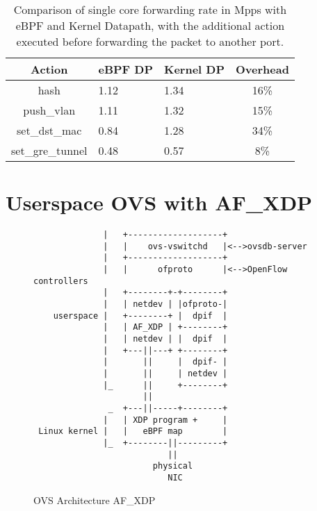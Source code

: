 \documentclass[10pt]{sigplanconf}
\begin{document}
\begin{table}
\centering
\small
\begin{tabular}{|c | p{1.4cm} | p{1.4cm}| c|}
\hline
{\bf Action} & {\bf eBPF DP} & {\bf Kernel DP} & {\bf Overhead}\\ \hline 
hash & 1.12 & 1.34 & 16\%\\ \hline
push\_vlan & 1.11 & 1.32 & 15\% \\ \hline
set\_dst\_mac & 0.84 &  1.28 & 34\% \\ \hline
set\_gre\_tunnel & 0.48 & 0.57 & 8\%\\ \hline 
\end{tabular}
\caption{\footnotesize Comparison of single core forwarding rate in Mpps
with eBPF and Kernel Datapath, with the additional
action executed before forwarding the packet to another port.}
\label{table:ebpfperf}
\end{table}

\section{Userspace OVS with AF\_XDP}
\label{sec:af_xdp}
\begin{figure}
{\scriptsize
\begin{verbatim}
              |   +-------------------+
              |   |    ovs-vswitchd   |<-->ovsdb-server
              |   +-------------------+
              |   |      ofproto      |<-->OpenFlow controllers
              |   +--------+-+--------+ 
              |   | netdev | |ofproto-|
    userspace |   +--------+ |  dpif  |
              |   | AF_XDP | +--------+
              |   | netdev | |  dpif  |
              |   +---||---+ +--------+
              |       ||     |  dpif- |
              |       ||     | netdev |
              |_      ||     +--------+  
                      ||         
               _  +---||-----+--------+
              |   | XDP program +     |
 Linux kernel |   |   eBPF map        |
              |_  +--------||---------+
                           ||
                        physical
                           NIC
\end{verbatim}
}
\vspace{-1.0em}
\caption{OVS Architecture AF\_XDP}
\label{ovsafxdp}
\vspace{-1.0em}
\end{figure}
\end{document}
